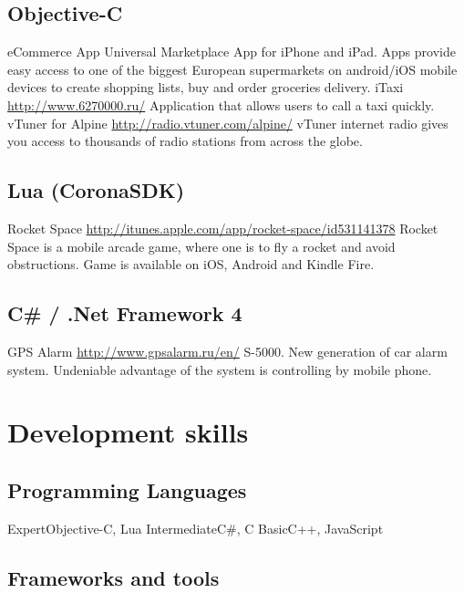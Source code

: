 \documentclass[11pt,a4paper]{moderncv}
\begin{document}
  \subsection{Objective-C}
  \cvline
    {eCommerce App}
    {Universal Marketplace App for iPhone and iPad. Apps provide easy access to one of the biggest European supermarkets on android/iOS mobile devices to create shopping lists, buy and order groceries delivery. }
  \cvline
    {iTaxi}
    {\url{http://www.6270000.ru/}\newline{}
    Application that allows users to call a taxi quickly.}
  \cvline
    {vTuner for Alpine}
    {\url{http://radio.vtuner.com/alpine/}\newline{}
    vTuner internet radio gives you access to thousands of radio stations from across the globe.}
    
  \subsection{Lua (CoronaSDK)}
  \cvline
    {Rocket Space}
    {\url{http://itunes.apple.com/app/rocket-space/id531141378}\newline{}
    Rocket Space is a mobile arcade game, where one is to fly a rocket and avoid obstructions.\newline
    Game is available on iOS, Android and Kindle Fire.}
    
  \subsection{C\# / .Net Framework 4}
  \cvline
    {GPS Alarm}
    {\url{http://www.gpsalarm.ru/en/}\newline{}
    S-5000. New generation of car alarm system.\newline
    Undeniable advantage of the system is controlling by mobile phone.}

\section{Development skills}
\subsection{Programming Languages}
\cvline
  {Expert}{Objective-C, Lua}
\cvline
  {Intermediate}{C\#, C}
\cvline
  {Basic}{C++, JavaScript}
\subsection{Frameworks and tools}
\end{document}
